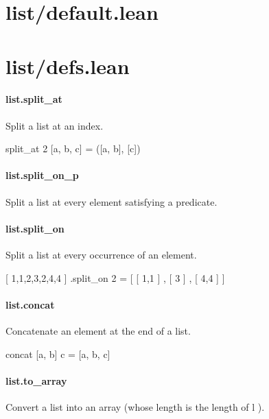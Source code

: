 \documentclass{article}
\begin{document}
\section{list/default.lean}\section{list/defs.lean}\paragraph{list.split\_at}
\par
Split a list at an index.
\\
\colorbox[RGB]{253,246,227}{\parbox{4.5in}{{{{\color[RGB]{101, 123, 131} split\_at  }}}{{{\color[RGB]{108, 113, 196} 2 }}}{{{\color[RGB]{101, 123, 131}  {[}a, b, c{]}  }}}{{{\color[RGB]{181, 137, 0} = }}}{{{\color[RGB]{101, 123, 131}  ({[}a, b{]}, {[}c{]}) }}}\\

}}\paragraph{list.split\_on\_p}
\par
Split a list at every element satisfying a predicate.
\paragraph{list.split\_on}
\par
Split a list at every occurrence of an element.
\par
{[}
1,1,2,3,2,4,4
{]}
.split\_on 2 = 
{[}
{[}
1,1
{]}
,
{[}
3
{]}
,
{[}
4,4
{]}
{]}
\paragraph{list.concat}
\par
Concatenate an element at the end of a list.
\\
\colorbox[RGB]{253,246,227}{\parbox{4.5in}{{{{\color[RGB]{101, 123, 131} concat {[}a, b{]} c  }}}{{{\color[RGB]{181, 137, 0} = }}}{{{\color[RGB]{101, 123, 131}  {[}a, b, c{]} }}}\\

}}\paragraph{list.to\_array}
\par
Convert a list into an array (whose length is the length of 
\colorbox[RGB]{253,246,227}{{{{\color[RGB]{101, 123, 131} l }}}}).
\end{document}
